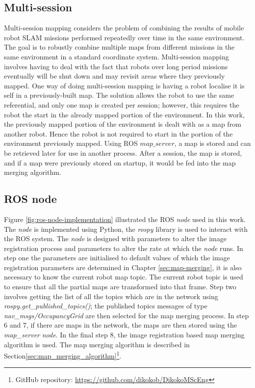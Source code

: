 \subsection{Multi-session}

Multi-session mapping considers the problem of combining the results of mobile robot SLAM missions performed repeatedly over time in the same environment. The goal is to robustly combine multiple maps from different missions in the same environment in a standard coordinate system. Multi-session mapping involves having to deal with the fact that robots over long period missions eventually will be shut down and may revisit areas where they previously mapped. One way of doing multi-session mapping is having a robot localise it is self in a previously-built map. The solution allows the robot to use the same referential, and only one map is created per session; however, this requires the robot the start in the already mapped portion of the environment. In this work, the previously mapped portion of the environment is dealt with as a map from another robot. Hence the robot is not required to start in the portion of the environment previously mapped. Using ROS \(map\_server\), a map is stored and can be retrieved later for use in another process. After a session, the map is stored, and if a map were previously stored on startup, it would be fed into the map merging algorithm.

\subsection{ROS node}

Figure \ref{fig:ros-node-implementation} illustrated the ROS \textit{node} used in this work. The \textit{node} is implemented using Python, the \textit{rospy} library is used to interact with the ROS system. The \textit{node} is designed with parameters to alter the image registration process and parameters to alter the rate at which the \textit{node} runs. In step one the parameters are initialised to default values of which the image registration parameters are determined in Chapter \ref{sec:map-merging}, it is also necessary to know the current robot map topic. The current robot topic is used to ensure that all the partial maps are transformed into that frame. Step two involves getting the list of all the topics which are in the network using \textit{rospy.get\_published\_topics()}; the published topics messages of type \textit{nav\_msgs/OccupancyGrid} are then selected for the map merging process. In step 6 and 7, if there are maps in the network, the maps are then stored using the \textit{map\_server} \textit{node}. In the final step 8, the image registration based map merging algorithm is used. The map merging algorithm is described in Section\ref{sec:map_merging_algorithm}\footnote{GitHub repository: \url{https://github.com/dikokob/DikokoMScEng}}.

